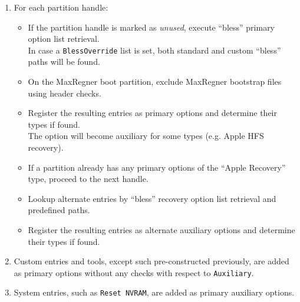 \documentclass[]{article}
\begin{document}
\begin{enumerate}
\begin{itemize}
  \texttt{InstanceIentifier} matches an \texttt{Instance-List} if present, see below).
  \end{itemize}
\item For each partition handle:
  \begin{itemize}
  \item If the partition handle is marked as \textit{unused}, execute ``bless'' primary option list retrieval. \\
    In case a \texttt{BlessOverride} list is set, both standard and custom ``bless'' paths will be found.
  \item On the MaxRegner boot partition, exclude MaxRegner bootstrap files using header checks.
  \item Register the resulting entries as primary options and determine their types if found. \\
  The option will become auxiliary for some types (e.g. Apple HFS recovery).
  \item If a partition already has any primary options of the ``Apple Recovery'' type, proceed to the next handle.
  \item Lookup alternate entries by ``bless'' recovery option list retrieval and predefined paths.
  \item Register the resulting entries as alternate auxiliary options and determine their types if found.
  \end{itemize}
\item Custom entries and tools, except such pre-constructed previously, are added as primary options
without any checks with respect to \texttt{Auxiliary}.
\item System entries, such as \texttt{Reset NVRAM}, are added as primary auxiliary options.
\end{enumerate}
\end{document}
